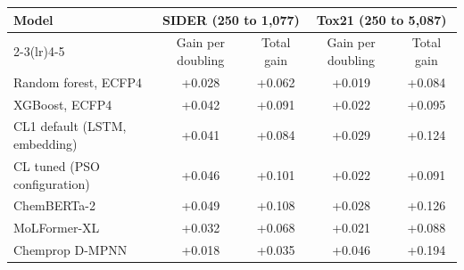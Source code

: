 \begin{tabular}{lcccc}
\toprule
Model & \multicolumn{2}{c}{SIDER (250 to 1{,}077)} & \multicolumn{2}{c}{Tox21 (250 to 5{,}087)} \\
\cmidrule(lr){2-3}\cmidrule(lr){4-5}
 & Gain per doubling & Total gain & Gain per doubling & Total gain \\
\midrule
Random forest, ECFP4 & +0.028 & +0.062 & +0.019 & +0.084 \\
XGBoost, ECFP4 & +0.042 & +0.091 & +0.022 & +0.095 \\
CL1 default (LSTM, embedding) & +0.041 & +0.084 & +0.029 & +0.124 \\
CL tuned (PSO configuration) & +0.046 & +0.101 & +0.022 & +0.091 \\
ChemBERTa-2 & +0.049 & +0.108 & +0.028 & +0.126 \\
MoLFormer-XL & +0.032 & +0.068 & +0.021 & +0.088 \\
Chemprop D-MPNN & +0.018 & +0.035 & +0.046 & +0.194 \\
\bottomrule
\end{tabular}
